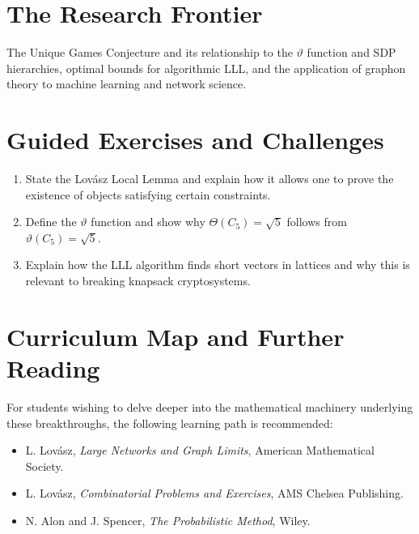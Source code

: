\section{The Research Frontier}
The Unique Games Conjecture and its relationship to the $\vartheta$ function and SDP hierarchies, optimal bounds for algorithmic LLL, and the application of graphon theory to machine learning and network science.

\section{Guided Exercises and Challenges}
\begin{enumerate}[label=\textbf{\arabic*.}]
  \item State the Lov\'asz Local Lemma and explain how it allows one to prove the existence of objects satisfying certain constraints.
  \item Define the $\vartheta$ function and show why $\Theta(C_5) = \sqrt{5}$ follows from $\vartheta(C_5) = \sqrt{5}$.
  \item Explain how the LLL algorithm finds short vectors in lattices and why this is relevant to breaking knapsack cryptosystems.
\end{enumerate}

\section{Curriculum Map and Further Reading}
For students wishing to delve deeper into the mathematical machinery underlying these breakthroughs, the following learning path is recommended:
\begin{itemize}
  \item L. Lov\'asz, \emph{Large Networks and Graph Limits}, American Mathematical Society.
  \item L. Lov\'asz, \emph{Combinatorial Problems and Exercises}, AMS Chelsea Publishing.
  \item N. Alon and J. Spencer, \emph{The Probabilistic Method}, Wiley.
\end{itemize}


